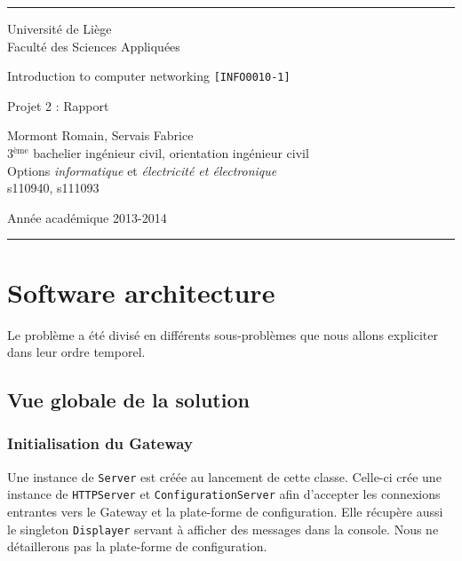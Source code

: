 \documentclass[a4paper,11pt]{article}
\begin{document}
\rule{1\linewidth}{1px}
{ \sc
\begin{center}
{\small Université de Liège}\\
{\small Faculté des Sciences Appliquées}

\end{center}

\vfill
\begin{center}

{\Huge Introduction to computer networking {\LARGE \tt [INFO0010-1]}\\}
\end{center}
\begin{center}
{\Huge Projet 2 : Rapport}
\end{center}
\begin{center}
Mormont Romain, Servais Fabrice\\
{\small 3$^{\text{ème}}$  bachelier ingénieur civil, orientation ingénieur civil}\\
{\small Options \textit{informatique} et \textit{électricité et électronique}}\\
{\small s110940, s111093}
\end{center}

\vfill
\begin{center}
Année académique 2013-2014\\
\end{center}
}
\rule{1\linewidth}{1px}
\newpage
\tableofcontents
\newpage
\section{Software architecture}
Le problème a été divisé en différents sous-problèmes que nous allons expliciter dans leur ordre temporel.

	\subsection{Vue globale de la solution}

	\subsubsection{Initialisation du Gateway}
Une instance de \texttt{Server} est créée au lancement de cette classe. Celle-ci crée une instance de \texttt{HTTPServer} et \texttt{ConfigurationServer} afin d'accepter les connexions entrantes vers le Gateway et la plate-forme de configuration. Elle récupère aussi le singleton \texttt{Displayer} servant à afficher des messages dans la console. Nous ne détaillerons pas la plate-forme de configuration.
\end{document}
